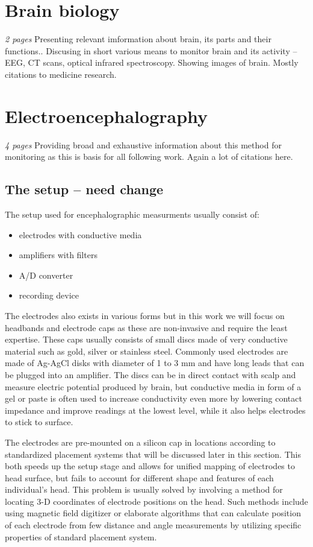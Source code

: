 \section{Brain biology}
\emph{2 pages}
Presenting relevant imformation about brain, its parts and their functions..
Discusing in short various means to monitor brain and its activity -- EEG, 
CT scans, optical infrared spectroscopy. Showing images of brain.
Mostly citations to medicine research.



\section{Electroencephalography}
\emph{4 pages}
Providing broad and exhaustive information about this method for monitoring as
this is basis for all following work. 
Again a lot of citations here.


\subsection{The setup -- need change}
The setup used for encephalographic measurments usually consist of: 
\begin{itemize}
  \item electrodes with conductive media
  \item amplifiers with filters
  \item A/D converter
  \item recording device
\end{itemize}

The electrodes also exists in various forms but in this work we will focus on
headbands and electrode caps as these are non-invasive and require the least
expertise. These caps usually consists of small discs made of very conductive
material such as gold, silver or stainless steel. Commonly used electrodes are
made of Ag-AgCl disks with diameter of 1 to 3 mm and have long leads that can be
plugged into an amplifier. \cite{eegFund} The discs can be in direct contact
with scalp and measure electric potential produced by brain, but conductive
media in form of a gel or paste is often used to increase conductivity even more
by lowering contact impedance and improve readings at the lowest level, while it
also helps electrodes to stick to surface.

The electrodes are pre-mounted on a silicon cap in locations according to
standardized placement systems that will be discussed later in this section.
This both speeds up the setup stage and allows for unified mapping of electrodes
to head surface, but fails to account for different shape and features of each
individual's head. \cite{eegFund} This problem is usually solved by involving a
method for locating 3-D coordinates of electrode positions on the head. Such
methods include using magnetic field digitizer or elaborate algorithms that can
calculate position of each electrode from few distance and angle measurements by
utilizing specific properties of standard placement system. \cite{rapidPos}

